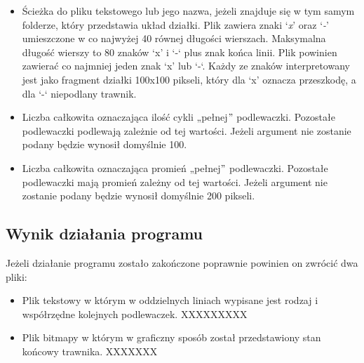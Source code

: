 \documentclass[12pt]{article}
\renewcommand{\_}{\kern-1.5pt\textunderscore\kern-1.5pt}
\begin{document}
\begin{itemize}
	\item Ścieżka do pliku tekstowego lub jego nazwa, jeżeli znajduje się w tym samym folderze, który przedstawia układ działki. Plik zawiera znaki ‘\textit{x}’ oraz ‘\textit{-}’\textit{ }umieszczone w co najwyżej 40 równej długości wierszach. Maksymalna długość wierszy to 80 znaków ‘x’ i ‘-‘ plus znak końca linii. Plik powinien zawierać co najmniej jeden znak ‘x’ lub ‘-‘. Każdy ze znaków interpretowany jest jako fragment działki 100x100 pikseli, który dla ‘x’ oznacza przeszkodę, a dla ‘-‘ niepodlany trawnik.\par

	\item Liczba całkowita oznaczająca ilość cykli „pełnej$"$  podlewaczki. Pozostałe podlewaczki podlewają zależnie od tej wartości. Jeżeli argument nie zostanie podany będzie wynosił domyślnie 100.\par

	\item Liczba całkowita oznaczająca promień „pełnej$"$  podlewaczki. Pozostałe podlewaczki mają promień zależny od tej wartości. Jeżeli argument nie zostanie podany będzie wynosił domyślnie 200 pikseli.
\end{itemize}\par


\vspace{\baselineskip}
\subsection*{Wynik działania programu}
Jeżeli działanie programu zostało zakończone poprawnie powinien on zwrócić dwa pliki:\par

\begin{itemize}
	\item Plik tekstowy w którym w oddzielnych liniach wypisane jest rodzaj i współrzędne kolejnych podlewaczek. XXXXXXXXX\par

	\item Plik bitmapy w którym w graficzny sposób został przedstawiony stan końcowy trawnika. XXXXXXX
\end{itemize}\par


\vspace{\baselineskip}
\end{document}
